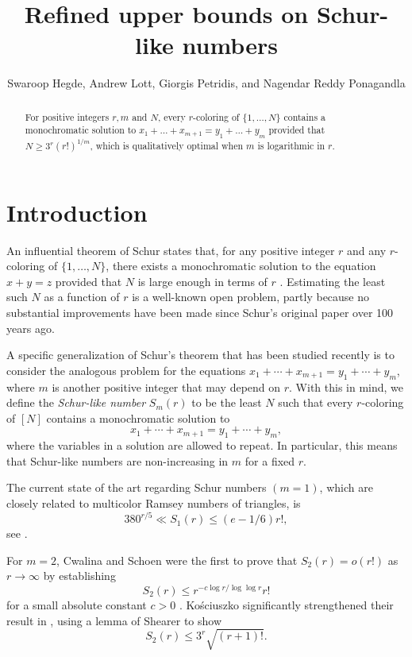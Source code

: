 \documentclass[11pt]{article}
\title{Refined upper bounds on Schur-like numbers}
\author{Swaroop Hegde, Andrew Lott, Giorgis Petridis, and Nagendar Reddy Ponagandla}
\date{}
\theoremstyle{plain}
\theoremstyle{definition}
\theoremstyle{definition}
\theoremstyle{remark}
\begin{document}
\maketitle

\begin{abstract}
For positive integers $r, m$ and $N$, every \(r\)-coloring of \(\{1, \dots, N\}\) contains a monochromatic solution to $x_1+\dots+x_{m+1}=y_1+\dots+y_m$ provided that $N \ge 3^r (r!)^{1/m}$, which is qualitatively optimal when $m$ is logarithmic in $r$.
\end{abstract}

\section{Introduction}

An influential theorem of Schur states that, for any positive integer $r$ and any $r$-coloring of $\{1, \dots, N\}$, there exists a monochromatic solution to the equation $x+y=z$ provided that $N$ is large enough in terms of $r$ \cite{Schur1917}. Estimating the least such $N$ as a function of $r$ is a well-known open problem, partly because no substantial improvements have been made since Schur's original paper over 100 years ago.

A specific generalization of Schur's theorem that has been studied recently is to consider the analogous problem for the equations $x_1+\cdots+x_{m+1}=y_1+\cdots+y_m$, where $m$ is another positive integer that may depend on $r$. With this in mind, we define the \emph{Schur-like number} \(S_m(r)\) to be the least \(N\) such that every \(r\)-coloring of \([N]\) contains a monochromatic solution to 
\begin{equation}\label{eq:schurlike}
    x_1+\cdots+x_{m+1}=y_1+\cdots+y_m,
\end{equation}
where the variables in a solution are allowed to repeat. In particular, this means that Schur-like numbers are non-increasing in $m$ for a fixed $r$. 

The current state of the art regarding Schur numbers $(m=1)$, which are closely related to multicolor Ramsey numbers of triangles, is
\[
380^{r/5} \ll S_1(r) \leq (e - 1/6)r!,
\]
see \cite{Abbott-Hanson1972, ACPPRT2022, Eliahou2020, Exoo1994, Fredricksen-Sweet2000, Wan1997, Whitehead1973, XXC2002}. 

For $m=2$, Cwalina and Schoen were the first to prove that $S_2(r) = o(r!)$ as $r\to\infty$ by establishing
\[
S_2(r) \le r^{-c \log r/ \log\log r} r!
\]
for a small absolute constant $c>0$ \cite{Cwalina-Schoen2017}. Ko\'sciuszko significantly strengthened their result in \cite{Kosciuszko2025}, using a lemma of Shearer \cite{Shearer1995} to show
\[
S_2(r) \le 3^r \sqrt{(r + 1)!}.
\]
\end{document}
